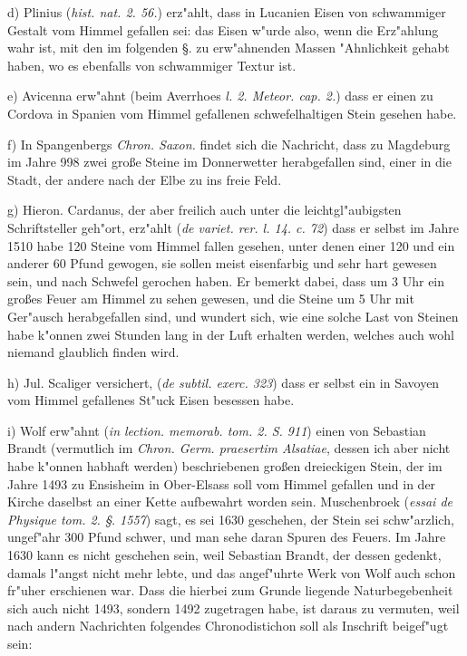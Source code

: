 \documentclass[a4paper, 11pt, oneside, polutonikogreek, german]{article}
\begin{document}
d) Plinius (\emph{hist. nat. 2. 56.}) erz"ahlt, dass in Lucanien Eisen von schwammiger Gestalt vom Himmel gefallen sei: das Eisen w"urde also, wenn die Erz"ahlung wahr ist, mit den im folgenden §. zu erw"ahnenden Massen "Ahnlichkeit gehabt haben, wo es ebenfalls von schwammiger Textur ist.

e) Avicenna erw"ahnt (beim Averrhoes \emph{l. 2. Meteor. cap. 2.}) dass er einen zu Cordova in Spanien vom Himmel gefallenen schwefelhaltigen Stein gesehen habe.

f) In Spangenbergs \emph{Chron. Saxon.} findet sich die Nachricht, dass zu Magdeburg im Jahre 998 zwei große Steine im Donnerwetter herabgefallen sind, einer in die Stadt, der andere nach der Elbe zu ins freie Feld.

g) Hieron. Cardanus, der aber freilich auch unter die leichtgl"aubigsten Schriftsteller geh"ort, erz"ahlt (\emph{de variet. rer. l. 14. c. 72}) dass er selbst im Jahre 1510 habe 120 Steine vom Himmel fallen gesehen, unter denen einer 120 und ein anderer 60 Pfund gewogen, sie sollen meist eisenfarbig und sehr hart gewesen sein, und nach Schwefel gerochen haben. Er bemerkt dabei, dass um 3 Uhr ein großes Feuer am Himmel zu sehen gewesen, und die Steine um 5 Uhr mit Ger"ausch herabgefallen sind, und wundert sich, wie eine solche Last von Steinen habe k"onnen zwei Stunden lang in der Luft erhalten werden, welches auch wohl niemand glaublich finden wird.

h) Jul. Scaliger versichert, (\emph{de subtil. exerc. 323}) dass er selbst ein in Savoyen vom Himmel gefallenes St"uck Eisen besessen habe.

i) Wolf erw"ahnt (\emph{in lection. memorab. tom. 2. S. 911}) einen von Sebastian Brandt (vermutlich im \emph{Chron. Germ. praesertim Alsatiae}, dessen ich aber nicht habe k"onnen habhaft werden) beschriebenen großen dreieckigen Stein, der im Jahre 1493 zu Ensisheim in Ober-Elsass soll vom Himmel gefallen und in der Kirche daselbst an einer Kette aufbewahrt worden sein. Muschenbroek (\emph{essai de Physique tom. 2. §. 1557}) sagt, es sei 1630 geschehen, der Stein sei schw"arzlich, ungef"ahr 300 Pfund schwer, und man sehe daran Spuren des Feuers. Im Jahre 1630 kann es nicht geschehen sein, weil Sebastian Brandt, der dessen gedenkt, damals l"angst nicht mehr lebte, und das angef"uhrte Werk von Wolf auch schon fr"uher erschienen war. Dass die hierbei zum Grunde liegende Naturbegebenheit sich auch nicht 1493, sondern 1492 zugetragen habe, ist daraus zu vermuten, weil nach andern Nachrichten folgendes Chronodistichon soll als Inschrift beigef"ugt sein:
\end{document}
